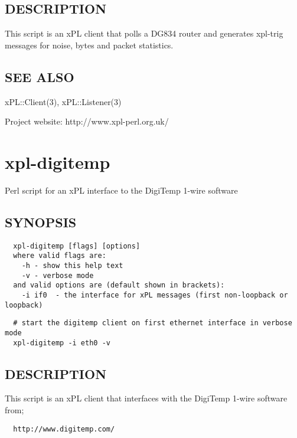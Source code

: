 \subsection*{DESCRIPTION\label{xpl-dg834_DESCRIPTION}}


This script is an xPL client that polls a DG834 router and generates
xpl-trig messages for noise, bytes and packet statistics.

\subsection*{SEE ALSO\label{xpl-dg834_SEE_ALSO}}


xPL::Client(3), xPL::Listener(3)



Project website: http://www.xpl-perl.org.uk/

\section{xpl-digitemp\label{xpl-digitemp}}


Perl script for an xPL interface to the DigiTemp 1-wire software

\subsection*{SYNOPSIS\label{xpl-digitemp_SYNOPSIS}}
\begin{verbatim}
  xpl-digitemp [flags] [options]
  where valid flags are:
    -h - show this help text
    -v - verbose mode
  and valid options are (default shown in brackets):
    -i if0  - the interface for xPL messages (first non-loopback or loopback)
\end{verbatim}
\begin{verbatim}
  # start the digitemp client on first ethernet interface in verbose mode
  xpl-digitemp -i eth0 -v
\end{verbatim}
\subsection*{DESCRIPTION\label{xpl-digitemp_DESCRIPTION}}


This script is an xPL client that interfaces with the DigiTemp 1-wire
software from;

\begin{verbatim}
  http://www.digitemp.com/
\end{verbatim}


